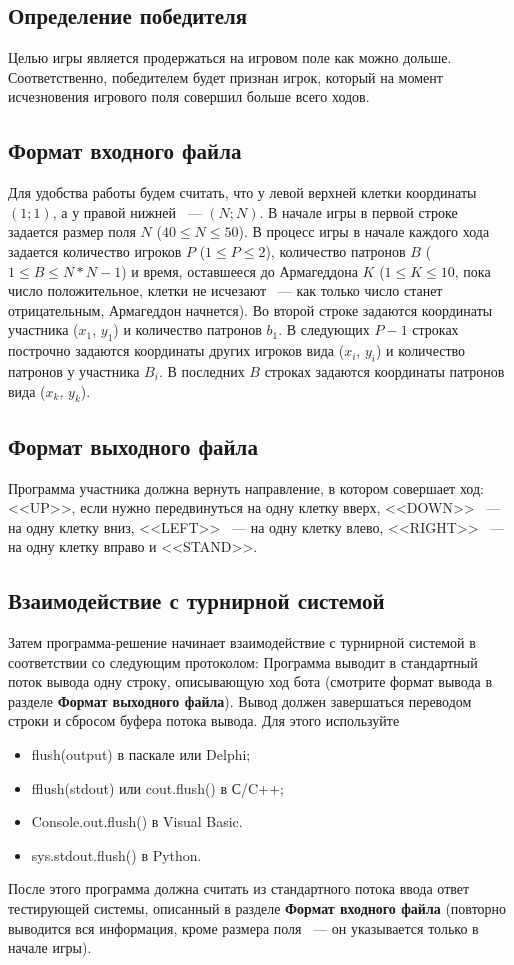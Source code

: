 \documentclass[a4paper,12pt]{article}
\begin{document}
\subsection{Определение победителя}
Целью игры является продержаться на игровом поле как можно дольше. Соответственно, победителем будет признан игрок, который на момент исчезновения игрового поля совершил больше всего ходов.

\subsection{Формат входного файла}
Для удобства работы будем считать, что у левой верхней клетки координаты $(1;1)$, а у правой нижней ~--- $(N;N)$. В начале игры в первой строке задается размер поля $N$ ($40 \leq N \leq 50$).
В процесс игры в начале каждого хода задается количество игроков $P$ ($1 \leq P \leq 2$), количество патронов $B$ ($1 \leq B \leq N*N - 1$) и время, оставшееся до Армагеддона $K$ ($1 \leq K \leq 10$, пока число положительное, клетки не исчезают ~--- как только число станет отрицательным, Армагеддон начнется).
Во второй строке задаются координаты участника ($x_1$, $y_1$) и количество патронов $b_1$.
В следующих $P-1$ строках построчно задаются координаты других игроков вида ($x_i$, $y_i$) и количество патронов у участника $B_i$.
В последних $B$ строках задаются координаты патронов вида ($x_k$, $y_k$).

\subsection{Формат выходного файла}
Программа участника должна вернуть направление, в котором совершает ход: <<UP>>, если нужно передвинуться на одну клетку вверх, <<DOWN>> ~--- на одну клетку вниз, <<LEFT>> ~--- на одну клетку влево, <<RIGHT>> ~--- на одну клетку вправо и <<STAND>>.

\subsection{Взаимодействие с турнирной системой}
Затем программа-решение начинает взаимодействие с турнирной системой в соответствии со следующим протоколом:
Программа выводит в стандартный поток вывода одну строку, описывающую ход бота (смотрите формат вывода в разделе \textbf{Формат выходного файла}). Вывод должен завершаться переводом строки и сбросом буфера потока
вывода. Для этого используйте
\begin{itemize}
\item flush(output) в паскале или Delphi;
\item fflush(stdout) или cout.flush() в С/C++;
\item Console.out.flush() в Visual Basic.
\item sys.stdout.flush() в Python.
\end{itemize}
После этого программа должна считать из стандартного потока ввода ответ тестирующей системы, описанный в разделе \textbf{Формат входного файла} (повторно выводится вся информация, кроме размера поля ~--- он указывается только в начале игры).
\end{document}
